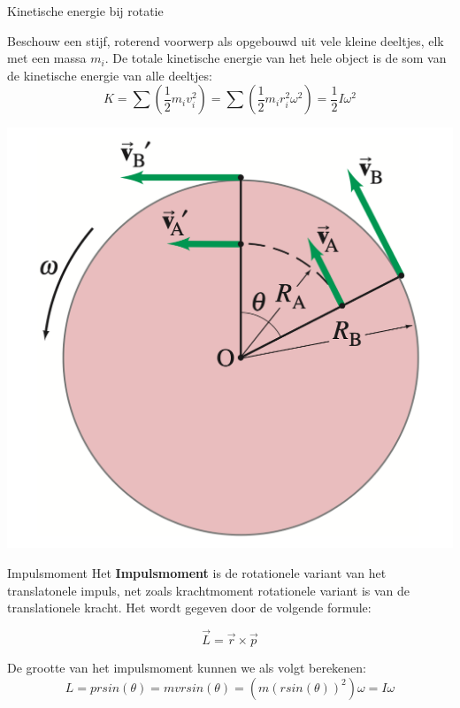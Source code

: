 \newpage

\begin{app}{Kinetische energie bij rotatie}
    \vspace{-0.5cm}
    \begin{minipage}{.69\textwidth}
        Beschouw een stijf, roterend voorwerp als opgebouwd uit vele kleine deeltjes, elk met een massa $m_i$. De totale kinetische energie van het hele object is de som van de kinetische energie van alle deeltjes:
        \begin{equation*}
            K = \sum(\dfrac{1}{2}m_iv_i^2) = \sum(\dfrac{1}{2}m_ir_i^2\omega^2) =  \dfrac{1}{2}I\omega^2
        \end{equation*}
    \end{minipage} 
    \begin{minipage}{.27\textwidth}
        \centering
        \includegraphics[scale = 0.15]{Images/Dynamica/SnelhedenOpRotatie.png}
    \end{minipage}
\end{app}

\begin{theo}[Impulsmoment]{Impulsmoment}
     Het \textbf{Impulsmoment} is de rotationele variant van het translatonele impuls, net zoals krachtmoment rotationele variant is van de translationele kracht. Het wordt gegeven door de volgende formule:
    
     \begin{equation*}
         \Vec{L} = \Vec{r} \times \Vec{p}
     \end{equation*}

     \noindent De grootte van het impulsmoment kunnen we als volgt berekenen:
     \begin{equation*}
         L = prsin(\theta) = mvrsin(\theta) = (m(rsin(\theta))^2)\omega = I\omega
     \end{equation*}
     \vspace{-0.5cm}
\end{theo}


